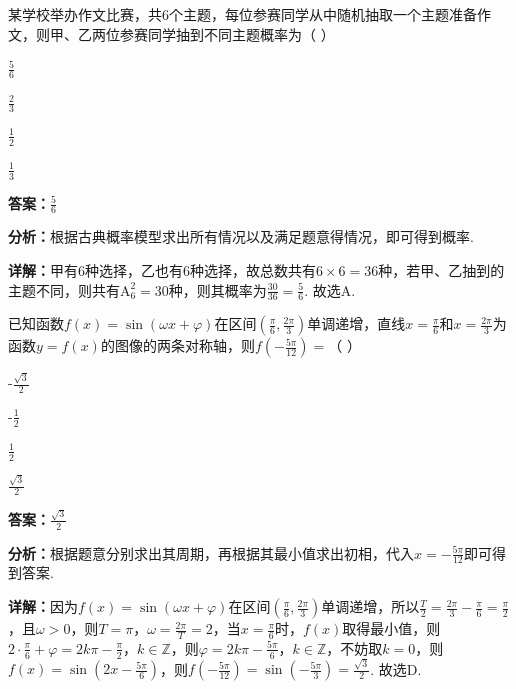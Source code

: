 \begin{question}[points=5]
某学校举办作文比赛，共6个主题，每位参赛同学从中随机抽取一个主题准备作文，则甲、乙两位参赛同学抽到不同主题概率为（   ）
\begin{choices}
  \item $\frac{5}{6}$
  \item $\frac{2}{3}$
  \item $\frac{1}{2}$
  \item $\frac{1}{3}$
\end{choices}
\begin{solution}
\textbf{答案：}$\frac{5}{6}$

\textbf{分析：}根据古典概率模型求出所有情况以及满足题意得情况，即可得到概率.

\textbf{详解：}甲有6种选择，乙也有6种选择，故总数共有$6\times6=36$种，若甲、乙抽到的主题不同，则共有$\mathrm{A}_6^2=30$种，则其概率为$\frac{30}{36}=\frac{5}{6}$. 故选A.
\end{solution}
\end{question}

\begin{question}[points=5]
已知函数$f(x)=\sin(\omega x+\varphi)$在区间$(\frac{\pi}{6},\frac{2\pi}{3})$单调递增，直线$x=\frac{\pi}{6}$和$x=\frac{2\pi}{3}$为函数$y=f(x)$的图像的两条对称轴，则$f(-\frac{5\pi}{12})=$（   ）
\begin{choices}
  \item -$\frac{\sqrt{3}}{2}$
  \item -$\frac{1}{2}$
  \item $\frac{1}{2}$
  \item $\frac{\sqrt{3}}{2}$
\end{choices}
\begin{solution}
\textbf{答案：}$\frac{\sqrt{3}}{2}$

\textbf{分析：}根据题意分别求出其周期，再根据其最小值求出初相，代入$x=-\frac{5\pi}{12}$即可得到答案.

\textbf{详解：}因为$f(x)=\sin(\omega x+\varphi)$在区间$(\frac{\pi}{6},\frac{2\pi}{3})$单调递增，所以$\frac{T}{2}=\frac{2\pi}{3}-\frac{\pi}{6}=\frac{\pi}{2}$，且$\omega>0$，则$T=\pi$，$\omega=\frac{2\pi}{T}=2$，当$x=\frac{\pi}{6}$时，$f(x)$取得最小值，则$2\cdot\frac{\pi}{6}+\varphi=2k\pi-\frac{\pi}{2}$，$k\in \mathbb{Z}$，则$\varphi=2k\pi-\frac{5\pi}{6}$，$k\in \mathbb{Z}$，不妨取$k=0$，则$f(x)=\sin(2x-\frac{5\pi}{6})$，则$f(-\frac{5\pi}{12})=\sin(-\frac{5\pi}{3})=\frac{\sqrt{3}}{2}$. 故选D.
\end{solution}
\end{question}

